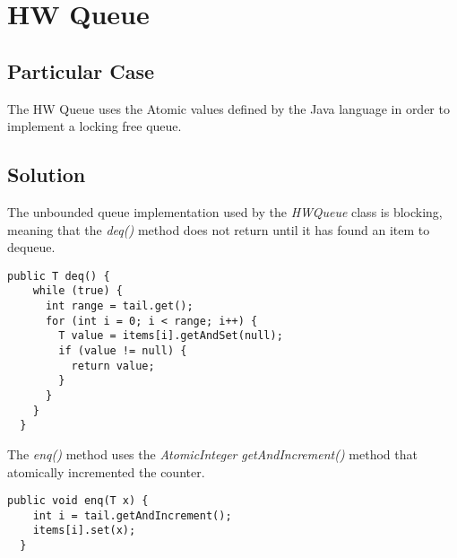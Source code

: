 


\section{\textbf{HW Queue}}



\subsection{Particular Case}
\par
The HW Queue uses the Atomic values defined by the Java language in order to implement a locking free queue.
\par



\subsection{Solution}
\par
The unbounded queue implementation used by the \textit{HWQueue} class is blocking, meaning that the \textit{deq()} method does not return until it has found an item to dequeue.  
\par
\begin{lstlisting}[frame=single,breaklines=true]
  public T deq() {
    while (true) {
      int range = tail.get();
      for (int i = 0; i < range; i++) {
        T value = items[i].getAndSet(null);
        if (value != null) {
          return value;
        }
      }
    }
  }
\end{lstlisting}
\par
The \textit{enq()} method uses the \textit{AtomicInteger} \textit{getAndIncrement()} method that atomically incremented the counter.
\par
\begin{lstlisting}[frame=single,breaklines=true]
  public void enq(T x) {
    int i = tail.getAndIncrement();
    items[i].set(x);
  }
\end{lstlisting}


